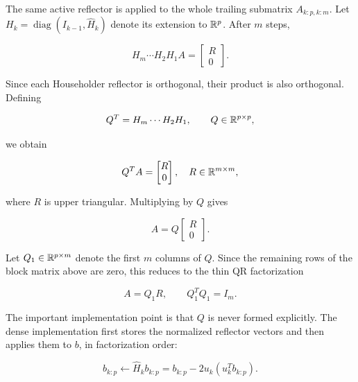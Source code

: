\noindent The same active reflector is applied to the whole trailing submatrix
$A_{k:p,k:m}$. Let $H_k=\operatorname{diag}(I_{k-1},\widehat H_k)$ denote
its extension to $\mathbb{R}^p$. After $m$ steps,

\begin{equation}
    H_m\cdots H_2H_1 A =
    \begin{bmatrix}
        R \\ 0
    \end{bmatrix}.
\end{equation}

\noindent Since each Householder reflector is orthogonal, their product is also
orthogonal. Defining

\begin{equation}
    Q^T = H_m \cdots H_2 H_1,
    \qquad
    Q \in \mathbb{R}^{p\times p},
\end{equation}

\noindent we obtain

\begin{equation}
    Q^T A =
    \begin{bmatrix}
        R \\
        0
    \end{bmatrix},
    \quad
    R \in \mathbb{R}^{m\times m},
\end{equation}

\noindent where $R$ is upper triangular. Multiplying by $Q$ gives

\begin{equation}
    A =
    Q
    \begin{bmatrix}
        R \\
        0
    \end{bmatrix}.
\end{equation}

\noindent Let $Q_1 \in \mathbb{R}^{p\times m}$ denote the first $m$ columns of $Q$. Since the remaining rows of the block matrix above are zero, this reduces to the thin QR factorization

\begin{equation}
    A = Q_1 R,
    \qquad
    Q_1^T Q_1 = I_m.
\end{equation}

\noindent The important implementation point is that $Q$ is never formed explicitly.
The dense implementation first stores the normalized reflector vectors and then
applies them to $b$, in factorization order:

\begin{equation}
    b_{k:p} \leftarrow \widehat H_k b_{k:p}
    =
    b_{k:p} - 2u_k \left(u_k^T b_{k:p}\right).
\end{equation}

